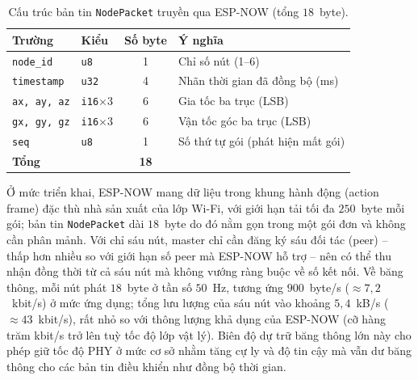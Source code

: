 \documentclass[../DoAn.tex]{subfiles}
\begin{document}
\begin{table}[h]
    \centering
    \caption{Cấu trúc bản tin \texttt{NodePacket} truyền qua ESP-NOW (tổng $18$~byte).}
    \label{tab:nodepacket}
    \begin{tabular}{llcl}
        \hline
        \textbf{Trường}     & \textbf{Kiểu}         & \textbf{Số byte} & \textbf{Ý nghĩa}                  \\
        \hline
        \texttt{node\_id}   & \texttt{u8}           & 1                & Chỉ số nút (1--6)                 \\
        \texttt{timestamp}  & \texttt{u32}          & 4                & Nhãn thời gian đã đồng bộ (ms)    \\
        \texttt{ax, ay, az} & \texttt{i16}$\times$3 & 6                & Gia tốc ba trục (LSB)             \\
        \texttt{gx, gy, gz} & \texttt{i16}$\times$3 & 6                & Vận tốc góc ba trục (LSB)         \\
        \texttt{seq}        & \texttt{u8}           & 1                & Số thứ tự gói (phát hiện mất gói) \\
        \hline
        \textbf{Tổng}       &                       & \textbf{18}      &                                   \\
        \hline
    \end{tabular}
\end{table}

Ở mức triển khai, ESP-NOW mang dữ liệu trong khung hành động (action frame) đặc
thù nhà sản xuất của lớp Wi-Fi, với giới hạn tải tối đa $250$~byte mỗi gói; bản
tin \texttt{NodePacket} dài $18$~byte do đó nằm gọn trong một gói đơn và không
cần phân mảnh. Với chỉ sáu nút, master chỉ cần đăng ký sáu đối tác (peer) -- thấp hơn nhiều so với giới hạn số peer mà ESP-NOW hỗ trợ -- nên có thể thu nhận đồng thời từ cả sáu nút mà không vướng ràng buộc về số kết nối. Về băng thông, mỗi nút phát $18$~byte ở tần số
$50$~Hz, tương ứng $900$~byte/s ($\approx 7{,}2$~kbit/s) ở mức ứng dụng; tổng lưu
lượng của sáu nút vào khoảng $5{,}4$~kB/s ($\approx 43$~kbit/s), rất nhỏ so với
thông lượng khả dụng của ESP-NOW (cỡ hàng trăm kbit/s trở lên tuỳ tốc độ lớp vật
lý). Biên độ dự trữ băng thông lớn này cho phép giữ tốc độ PHY ở mức cơ sở nhằm
tăng cự ly và độ tin cậy mà vẫn dư băng thông cho các bản tin điều khiển như đồng
bộ thời gian.
\end{document}

